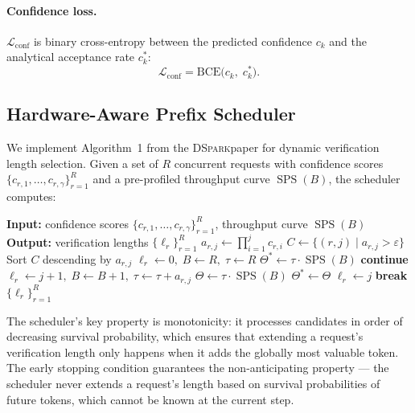 \documentclass[11pt,a4paper]{article}
\newcommand{\DSpark}{\textsc{DSpark}}
\DeclareMathOperator{\SPS}{SPS}
\begin{document}
\paragraph{Confidence loss.}
$\mathcal{L}_\text{conf}$ is binary cross-entropy between the predicted
confidence $c_k$ and the analytical acceptance rate $c_k^*$:
\begin{equation}
  \mathcal{L}_\text{conf} = \text{BCE}\bigl(c_k,\; c_k^*\bigr).
\end{equation}

\subsection{Hardware-Aware Prefix Scheduler}
\label{subsec:scheduler}

We implement Algorithm~1 from the \DSpark paper for dynamic verification
length selection. Given a set of $R$ concurrent requests with confidence
scores $\{c_{r,1}, \ldots, c_{r,\gamma}\}_{r=1}^R$ and a pre-profiled
throughput curve $\SPS(B)$, the scheduler computes:

\begin{algorithm}[t]
\caption{Hardware-Aware Prefix Scheduler (Algorithm~1)}
\label{alg:scheduler}
\begin{algorithmic}[1]
\State \textbf{Input:} confidence scores $\{c_{r,1}, \ldots, c_{r,\gamma}\}_{r=1}^R$, throughput curve $\SPS(B)$
\State \textbf{Output:} verification lengths $\{\ell_r\}_{r=1}^R$
  \State $a_{r,j} \gets \prod_{i=1}^j c_{r,i}$ 
\EndFor
\State $C \gets \{(r,j) \mid a_{r,j} > \varepsilon\}$ 
\State Sort $C$ descending by $a_{r,j}$
\State $\ell_r \gets 0,\; B \gets R,\; \tau \gets R$ 
\State $\Theta^* \gets \tau \cdot \SPS(B)$
   
    \State \textbf{continue}
  \EndIf
  \State $\ell_r \gets j+1,\; B \gets B+1,\; \tau \gets \tau + a_{r,j}$
  \State $\Theta \gets \tau \cdot \SPS(B)$
  \If{$\Theta > \Theta^*$}
    \State $\Theta^* \gets \Theta$
  \Else
    \State $\ell_r \gets j$ 
    \State \textbf{break}
  \EndIf
\EndFor
\State \Return $\{\ell_r\}_{r=1}^R$
\end{algorithmic}
\end{algorithm}

The scheduler's key property is monotonicity: it processes candidates in
order of decreasing survival probability, which ensures that extending a
request's verification length only happens when it adds the globally most
valuable token. The early stopping condition guarantees the
non-anticipating property --- the scheduler never extends a request's
length based on survival probabilities of future tokens, which cannot be
known at the current step.
\end{document}
